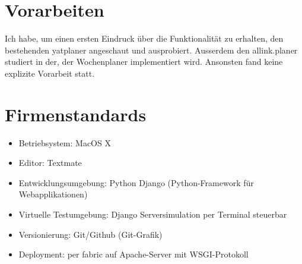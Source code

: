 \section{Vorarbeiten}
Ich habe, um einen ersten Eindruck über die Funktionalität zu erhalten, den bestehenden yatplaner angeschaut und ausprobiert.
Ausserdem den allink.planer studiert in der, der Wochenplaner implementiert wird.
Ansonsten fand keine explizite Vorarbeit statt.

\section{Firmenstandards}
\begin{itemize}
    \item Betriebsystem: MacOS X
    \item Editor: Textmate
    \item Entwicklungsumgebung: Python Django (Python-Framework für Webapplikationen)
    \item Virtuelle Testumgebung: Django Serversimulation per Terminal steuerbar
    \item Versionierung: Git/Github (Git-Grafik)
    \item Deployment: per fabric auf Apache-Server mit WSGI-Protokoll
\end{itemize}
